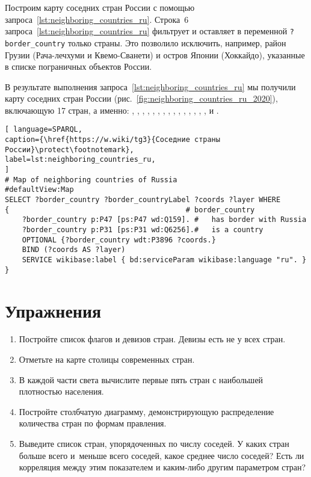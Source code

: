 Построим карту соседних стран России с помощью запроса~\ref{lst:neighboring_countries_ru}.
Строка~6 запроса~\ref{lst:neighboring_countries_ru} 
фильтрует и оставляет в переменной \lstinline|?border_country| только страны.
Это позволило исключить, например, район Грузии (Рача-лечхуми и Квемо-Сванети) 
и остров Японии (Хоккайдо), указанные в списке пограничных объектов России.

В результате выполнения запроса~\ref{lst:neighboring_countries_ru} мы получили 
карту соседних стран России 
(рис.~\ref{fig:neighboring_countries_ru_2020}), включающую 17 стран, а именно: 
, , , , , , , , , , , , , , ,  и .


\begin{lstlisting}[ language=SPARQL, 
caption={\href{https://w.wiki/tg3}{Соседние страны России}\protect\footnotemark},
label=lst:neighboring_countries_ru, 
]
# Map of neighboring countries of Russia
#defaultView:Map
SELECT ?border_country ?border_countryLabel ?coords ?layer WHERE 
{                                         # border_country
	?border_country p:P47 [ps:P47 wd:Q159]. #   has border with Russia
	?border_country p:P31 [ps:P31 wd:Q6256].#   is a country
	OPTIONAL {?border_country wdt:P3896 ?coords.}
	BIND (?coords AS ?layer)
	SERVICE wikibase:label { bd:serviceParam wikibase:language "ru". }
}
\end{lstlisting}


\section{Упражнения}

\begin{enumerate}[noitemsep,topsep=0pt]
	\item Постройте список флагов и девизов стран. Девизы есть не у всех стран.
	\item Отметьте на карте столицы современных стран.
	\item В каждой части света вычислите первые пять стран с наибольшей плотностью населения.
	\item Постройте столбчатую диаграмму, демонстрирующую распределение количества стран по формам правления.
	\item Выведите список стран, упорядоченных по числу соседей. У каких стран больше всего и~меньше всего соседей, какое среднее число соседей? Есть ли корреляция между этим показателем и каким-либо другим параметром стран?
\end{enumerate}

